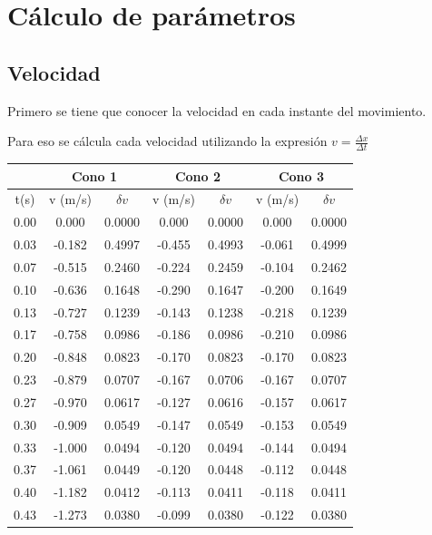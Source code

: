 \section{Cálculo de parámetros}

\subsection{Velocidad}

Primero se tiene que conocer la velocidad en cada instante del movimiento.

Para eso se cálcula cada velocidad utilizando la expresión $v = \frac{\Delta x}{\Delta t}$

\clearpage
\begin{longtable}{|c|c|c|c|c|c|c|}
    \hline
    \rowcolor{azulito} & \multicolumn{2}{c|}{Cono 1} & \multicolumn{2}{c|}{Cono 2} & \multicolumn{2}{c|}{Cono 3} \\
    \hline
    \rowcolor{azulito} t(s) & v (m/s) & $\delta v$ & v (m/s) & $\delta v$ & v (m/s) & $\delta v$ \\
    \endhead
    \hline 0.00 & 0.000 & 0.0000 & 0.000 & 0.0000 & 0.000 & 0.0000 \\
    \hline 0.03 & -0.182 & 0.4997 & -0.455 & 0.4993 & -0.061 & 0.4999 \\
    \hline 0.07 & -0.515 & 0.2460 & -0.224 & 0.2459 & -0.104 & 0.2462 \\
    \hline 0.10 & -0.636 & 0.1648 & -0.290 & 0.1647 & -0.200 & 0.1649 \\
    \hline 0.13 & -0.727 & 0.1239 & -0.143 & 0.1238 & -0.218 & 0.1239 \\
    \hline 0.17 & -0.758 & 0.0986 & -0.186 & 0.0986 & -0.210 & 0.0986 \\
    \hline 0.20 & -0.848 & 0.0823 & -0.170 & 0.0823 & -0.170 & 0.0823 \\
    \hline 0.23 & -0.879 & 0.0707 & -0.167 & 0.0706 & -0.167 & 0.0707 \\
    \hline 0.27 & -0.970 & 0.0617 & -0.127 & 0.0616 & -0.157 & 0.0617 \\
    \hline 0.30 & -0.909 & 0.0549 & -0.147 & 0.0549 & -0.153 & 0.0549 \\
    \hline 0.33 & -1.000 & 0.0494 & -0.120 & 0.0494 & -0.144 & 0.0494 \\
    \hline 0.37 & -1.061 & 0.0449 & -0.120 & 0.0448 & -0.112 & 0.0448 \\
    \hline 0.40 & -1.182 & 0.0412 & -0.113 & 0.0411 & -0.118 & 0.0411 \\
    \hline 0.43 & -1.273 & 0.0380 & -0.099 & 0.0380 & -0.122 & 0.0380 \\

\end{longtable}
